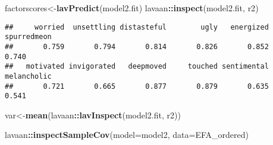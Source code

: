 \documentclass[
]{article}
\newenvironment{Shaded}{\begin{snugshade}}{\end{snugshade}}
\newcommand{\DataTypeTok}[1]{\textcolor[rgb]{0.13,0.29,0.53}{#1}}
\newcommand{\KeywordTok}[1]{\textcolor[rgb]{0.13,0.29,0.53}{\textbf{#1}}}
\newcommand{\NormalTok}[1]{#1}
\newcommand{\OperatorTok}[1]{\textcolor[rgb]{0.81,0.36,0.00}{\textbf{#1}}}
\newcommand{\StringTok}[1]{\textcolor[rgb]{0.31,0.60,0.02}{#1}}
\begin{document}
\begin{Shaded}
\begin{Highlighting}[]
\NormalTok{factorscores\textless{}{-}}\KeywordTok{lavPredict}\NormalTok{(model2.fit)}
\NormalTok{lavaan}\OperatorTok{::}\KeywordTok{inspect}\NormalTok{(model2.fit, }\StringTok{\textquotesingle{}r2\textquotesingle{}}\NormalTok{)}
\end{Highlighting}
\end{Shaded}

\begin{verbatim}
##     worried  unsettling distasteful        ugly   energized spurredmeon 
##       0.759       0.794       0.814       0.826       0.852       0.740 
##   motivated invigorated   deepmoved     touched sentimental melancholic 
##       0.721       0.665       0.877       0.879       0.635       0.541
\end{verbatim}

\begin{Shaded}
\begin{Highlighting}[]
\NormalTok{var\textless{}{-}}\KeywordTok{mean}\NormalTok{(lavaan}\OperatorTok{::}\KeywordTok{lavInspect}\NormalTok{(model2.fit, }\StringTok{\textquotesingle{}r2\textquotesingle{}}\NormalTok{))}

\NormalTok{lavaan}\OperatorTok{::}\KeywordTok{inspectSampleCov}\NormalTok{(}\DataTypeTok{model=}\NormalTok{model2, }\DataTypeTok{data=}\NormalTok{EFA\_ordered)}
\end{Highlighting}
\end{Shaded}
\end{document}
